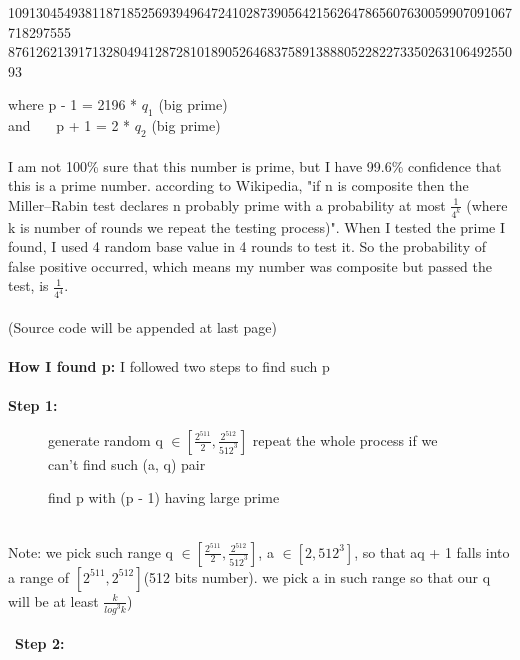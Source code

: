 \documentclass[12pt,letterpaper]{article}
\begin{document}
\begin{enumerate}
  109130454938118718525693949647241028739056421562647865607630059907091067718297555\\
  87612621391713280494128728101890526468375891388805228227335026310649255093
  
  where p - 1 = 2196 * $q_1$ (big prime) \\
  and \ \ \ p + 1 = 2 * $q_2$ (big prime) \\\\
  I am not 100\% sure that this number is prime, but I have 99.6\% confidence that this is a prime number. according to Wikipedia, "if n is composite then the Miller–Rabin test declares n probably prime with a probability at most $\frac{1}{4^{k}}$ (where k is number of rounds we repeat the testing process)". When I tested the prime I found, I used 4 random base value in 4 rounds to test it.  So the probability of false positive occurred, which means my number was composite but passed the test, is $\frac{1}{4^{4}}$.\\\\  
  (Source code will be appended at last page) \\\\
  \textbf{How I found p: } I followed two steps to find such p\\\\
  \textbf{Step 1:} 
   \begin{figure}[ht]
      \centering
      \begin{minipage}{.7\linewidth}
        \begin{algorithm}[H]
        \SetAlgoLined
          generate random q $\in [\frac{2^{511}}{2}, \frac{2^{512}}{512^3}]$ \;
          repeat the whole process if we can't find such (a, q) pair
         \caption{find p with (p - 1) having large prime}
        \end{algorithm}
      \end{minipage}
    \end{figure} \\
  Note: we pick such range q $\in [\frac{2^{511}}{2}, \frac{2^{512}}{512^3}]$, a $\in [2, 512^3]$, so that aq + 1 falls into a range of  $[2^{511}, 2^{512}]$(512 bits number).  we pick a in such range so that our q will be at least $\frac{k}{log^3 k}$) \\\\\
  \textbf{Step 2:}
  \begin{figure}[ht]

\end{figure}
\end{enumerate}
\end{document}
